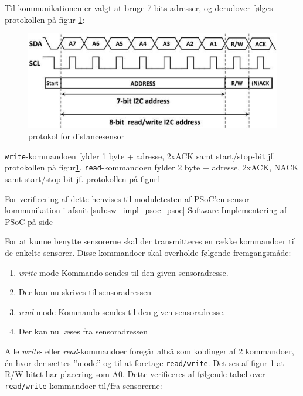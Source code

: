 Til kommunikationen er valgt at bruge 7-bits adresser, og derudover følges protokollen på figur \ref{fig:ds_prtl}: 

\begin{figure}[ht]
	\centering
	\includegraphics[scale=0.6]{../fig/billeder/distancesensor_protokol.png}
	\caption{\IIC protokol for distancesensor}
	\label{fig:ds_prtl}
\end{figure}

\texttt{write}-kommandoen fylder 1 byte + adresse, 2xACK samt start/stop-bit jf. protokollen på figur\ref{fig:ds_prtl}. 
\texttt{read}-kommandoen fylder 2 byte + adresse, 2xACK, NACK samt start/stop-bit jf. protokollen på figur\ref{fig:ds_prtl}

For verificering af dette henvises til moduletesten af PSoC'en-sensor kommunikation i afsnit \ref{sub:sw_impl_psoc_psoc} Software Implementering af PSoC på side \pageref{sub:sw_impl_psoc_psoc}

For at kunne benytte sensorerne skal der transmitteres en række kommandoer til de enkelte sensorer. Disse kommandoer skal overholde følgende fremgangsmåde:

\begin{enumerate}
  \item \textit{write}-mode-Kommando sendes til den given sensoradresse.
  \item Der kan nu skrives til sensoradressen
  \item \textit{read}-mode-Kommando sendes til den given sensoradresse.
  \item Der kan nu læses fra sensoradressen
\end{enumerate}

Alle \textit{write}- eller \textit{read}-kommandoer foregår altså som koblinger af 2 kommandoer, én hvor der sættes ''mode'' og til at foretage \texttt{read/write}. Det ses af figur \ref{fig:ds_prtl} at R/W-bitet har placering som A0.
Dette verificeres af følgende tabel over  \texttt{read/write}-kommandoer til/fra sensorerne: 

